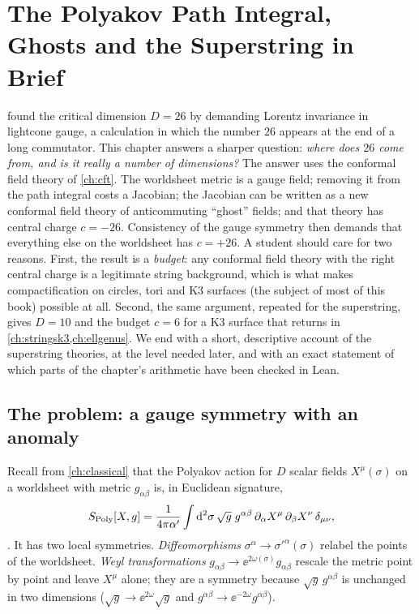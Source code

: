 \chapter{The Polyakov Path Integral, Ghosts and the Superstring in Brief}\label{ch:ghosts}

 found the critical dimension $D=26$ by demanding Lorentz invariance in
lightcone gauge, a calculation in which the number $26$ appears at the end of a long
commutator. This chapter answers a sharper question: \emph{where does $26$ come from, and is it
really a number of dimensions?} The answer uses the conformal field theory of \cref{ch:cft}.
The worldsheet metric is a gauge field; removing it from the path integral costs a Jacobian;
the Jacobian can be written as a new conformal field theory of anticommuting ``ghost'' fields;
and that theory has central charge $c=-26$. Consistency of the gauge symmetry then demands
that everything else on the worldsheet has $c=+26$. A student should care for two reasons.
First, the result is a \emph{budget}: any conformal field theory with the right central charge
is a legitimate string background, which is what makes compactification on circles, tori and
K3 surfaces (the subject of most of this book) possible at all. Second, the same argument,
repeated for the superstring, gives $D=10$ and the budget $c=6$ for a K3 surface that returns
in \cref{ch:stringsk3,ch:ellgenus}. We end with a short, descriptive account of the
superstring theories, at the level needed later, and with an exact statement of which parts
of the chapter's arithmetic have been checked in Lean.

\section{The problem: a gauge symmetry with an anomaly}\label{sec:ghosts:problem}

Recall from \cref{ch:classical} that the Polyakov action for $D$
scalar fields $X^\mu(\sigma)$ on a worldsheet with metric $g_{\alpha\beta}$ is, in Euclidean
signature,
\begin{equation}\label{eq:ghosts:poly}
  S_{\mathrm{Poly}}[X,g]=\frac{1}{4\pi\alpha'}\int \mathrm{d}^2\sigma\,\sqrt{g}\;
  g^{\alpha\beta}\,\partial_\alpha X^\mu\,\partial_\beta X^\nu\,\delta_{\mu\nu},
\end{equation}
. It has two local symmetries. \emph{Diffeomorphisms}
$\sigma^\alpha\to\sigma'^\alpha(\sigma)$ relabel the points of the worldsheet. \emph{Weyl
transformations} $g_{\alpha\beta}\to\ee^{2\omega(\sigma)}g_{\alpha\beta}$
rescale the metric point by point and leave $X^\mu$ alone; they are a symmetry because
$\sqrt{g}\,g^{\alpha\beta}$ is unchanged in two dimensions
($\sqrt{g}\to\ee^{2\omega}\sqrt g$ and $g^{\alpha\beta}\to\ee^{-2\omega}g^{\alpha\beta}$).

